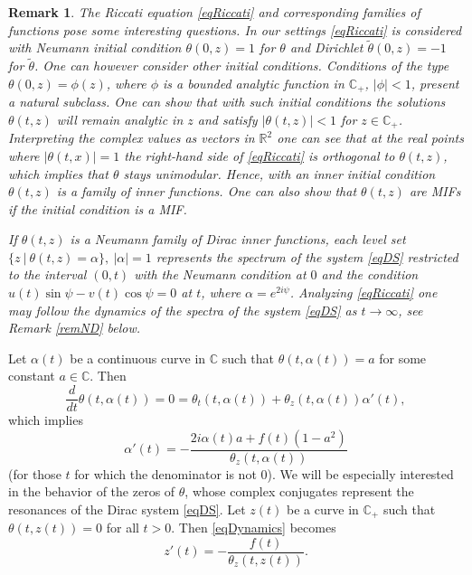 \documentclass[11pt,twoside,reqno]{amsart}
\def\ti{\tilde}
\def\to{\rightarrow}
\def\R{{\mathbb R}}
\def\C{{\mathbb{C}}}
\def\a{\alpha}
\theoremstyle{plain}
\newtheorem{remark}{Remark}
\numberwithin{equation}{section}
\begin{document}
\begin{remark} The Riccati equation \eqref{eqRiccati} and corresponding families of functions  pose some interesting  questions.
In our settings  \eqref{eqRiccati} is considered with Neumann initial condition $\theta(0,z)=1$ for $\theta$ and
Dirichlet $\ti\theta(0,z)=-1$ for $\ti\theta$.
One can however consider other initial conditions. Conditions of the type
$\theta(0,z)=\phi(z)$, where $\phi$ is a bounded analytic function in $\C_+$, $|\phi|<1$, present a natural subclass.
One can show that with such initial conditions the solutions $\theta(t,z)$ will remain analytic in $z$ and satisfy $|\theta(t,z)|<1$ for $z\in\C_+$.
Interpreting the complex values as vectors in $\R^2$ one can see that at the real points where $|\theta(t,x)|=1$ the right-hand side of \eqref{eqRiccati} is orthogonal to $\theta(t,z)$, which implies that $\theta$ stays unimodular. Hence, with an inner initial condition
$\theta(t,z)$ is a family of inner functions. One can also show that $\theta(t,z)$ are MIFs if the initial condition is a MIF.

If $\theta(t,z)$ is a Neumann family of Dirac inner functions, each level set $\{z\ |\ \theta(t,z)=\a\},\ |\a|=1$  represents
the spectrum of the system \eqref{eqDS} restricted to the interval $(0,t)$ with the Neumann  condition at $0$ and
the condition $u(t)\sin\psi-v(t)\cos\psi=0$ at $t$, where $\a=e^{2i\psi}$. Analyzing \eqref{eqRiccati} one may follow the dynamics
of the spectra of the system \eqref{eqDS} as $t\to\infty$, see Remark \ref{remND} below.


\end{remark}




Let $\a(t)$ be a continuous curve in $\C$ such that $\theta(t,\alpha(t))=a$ for some constant $a\in \C$.
Then
$$\frac d{d t}\theta(t,\a(t))=0=\theta_t(t,\a(t))+\theta_z(t,\a(t))\a'(t),
$$
which implies
\begin{equation}\a'(t)=-\frac{2i\a(t) a + f(t)(1-a^2)}{\theta_z(t,\a(t))}\label{eqDynamics}
\end{equation}
(for those $t$ for which the denominator is not $0$).
We will be especially interested in the behavior of the zeros of $\theta$, whose complex conjugates represent
the resonances of the Dirac system \eqref{eqDS}. Let $z(t)$ be a curve in $\C_+$ such that $\theta(t,z(t))=0$ for all $t>0$.
Then \eqref{eqDynamics} becomes
\begin{equation}z'(t)=-\frac{f(t)}{\theta_z(t,z(t))}.
\label{eqDynRes}
\end{equation}
\end{document}
